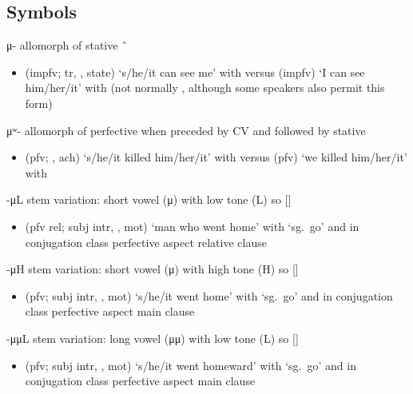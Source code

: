 \subsection{Symbols}\label{sec:alphalist-sym}
\begin{morphdesc}[resume*=alphalist]
\item[μ-]\label{m:μ-}
	allomorph of stative  \~\ 
	\begin{itemize}
	\item	{} (impfv; tr, ,  state) ‘s/he/it can see me’
			with \newline
		versus  (impfv) ‘I can see him/her/it’
			with \newline
		(not normally , although some speakers also permit this form)
	\end{itemize}

\item[μʷ-]\label{m:μʷ-}
	allomorph of perfective  when preceded by CV and followed by stative 
	\begin{itemize}
	\item	{} (pfv; , ach) ‘s/he/it killed him/her/it’
			with \newline
		versus  (pfv) ‘we killed him/her/it’
			with 
	\end{itemize}

\item[-μL]\label{m:-μL}
	stem variation: short vowel (μ) with low tone (L) so []
	\begin{itemize}
	\item	{} (pfv rel; subj intr, , mot) ‘man who went home’
		with  ‘sg.\ go’ and 
		in  conjugation class perfective aspect relative clause
	\end{itemize}

\item[-μH]\label{m:-μH}
	stem variation: short vowel (μ) with high tone (H) so []
	\begin{itemize}
	\item	{} (pfv; subj intr, , mot) ‘s/he/it went home’
		with  ‘sg.\ go’ and 
		in  conjugation class perfective aspect main clause
	\end{itemize}

\item[-μμL]\label{m:-μμL}
	stem variation: long vowel (μμ) with low tone (L) so []
	\begin{itemize}
	\item	{} (pfv; subj intr, , mot) ‘s/he/it went homeward’
		with  ‘sg.\ go’ and 
		in  conjugation class perfective aspect main clause
	\end{itemize}


\end{morphdesc}
